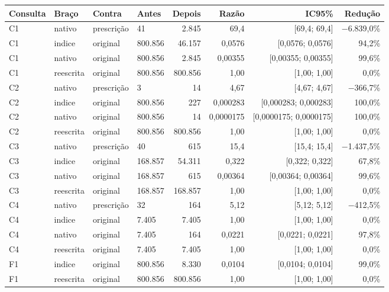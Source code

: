 {\footnotesize\setlength{\tabcolsep}{4pt}
\begin{tabular}{llllrrrr}
\toprule
Consulta & Braço & Contra & Antes & Depois & Razão & IC95\% & Redução \\
\midrule
C1 & nativo & prescrição & 41 & 2.845 & 69,4 & [69,4; 69,4] & $-$6.839,0\% \\
C1 & indice & original & 800.856 & 46.157 & 0,0576 & [0,0576; 0,0576] & 94,2\% \\
C1 & nativo & original & 800.856 & 2.845 & 0,00355 & [0,00355; 0,00355] & 99,6\% \\
C1 & reescrita & original & 800.856 & 800.856 & 1,00 & [1,00; 1,00] & 0,0\% \\
C2 & nativo & prescrição & 3 & 14 & 4,67 & [4,67; 4,67] & $-$366,7\% \\
C2 & indice & original & 800.856 & 227 & 0,000283 & [0,000283; 0,000283] & 100,0\% \\
C2 & nativo & original & 800.856 & 14 & 0,0000175 & [0,0000175; 0,0000175] & 100,0\% \\
C2 & reescrita & original & 800.856 & 800.856 & 1,00 & [1,00; 1,00] & 0,0\% \\
C3 & nativo & prescrição & 40 & 615 & 15,4 & [15,4; 15,4] & $-$1.437,5\% \\
C3 & indice & original & 168.857 & 54.311 & 0,322 & [0,322; 0,322] & 67,8\% \\
C3 & nativo & original & 168.857 & 615 & 0,00364 & [0,00364; 0,00364] & 99,6\% \\
C3 & reescrita & original & 168.857 & 168.857 & 1,00 & [1,00; 1,00] & 0,0\% \\
C4 & nativo & prescrição & 32 & 164 & 5,12 & [5,12; 5,12] & $-$412,5\% \\
C4 & indice & original & 7.405 & 7.405 & 1,00 & [1,00; 1,00] & 0,0\% \\
C4 & nativo & original & 7.405 & 164 & 0,0221 & [0,0221; 0,0221] & 97,8\% \\
C4 & reescrita & original & 7.405 & 7.405 & 1,00 & [1,00; 1,00] & 0,0\% \\
F1 & indice & original & 800.856 & 8.330 & 0,0104 & [0,0104; 0,0104] & 99,0\% \\
F1 & reescrita & original & 800.856 & 800.856 & 1,00 & [1,00; 1,00] & 0,0\% \\

\end{tabular}}
